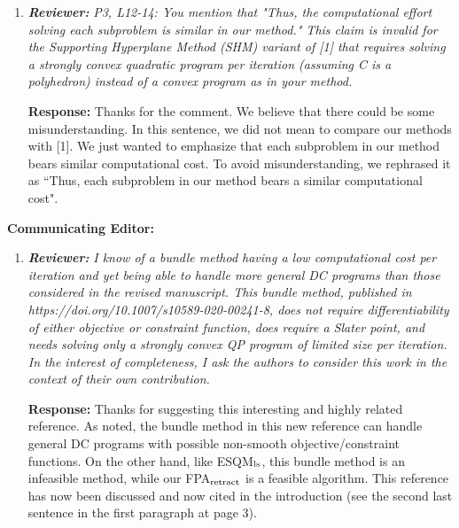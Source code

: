 \documentclass{article}
\begin{document}
\begin{enumerate}
    \item \textit{\textbf{Reviewer:}} \textit{P3, L12-14: You mention that "Thus, the computational effort solving each subproblem is similar in our method."
        This claim is invalid for the Supporting Hyperplane Method (SHM) variant of [1] that requires solving a strongly convex quadratic program per iteration (assuming C is a polyhedron) instead of a convex program as in your method.}
        
    \textbf{Response:} Thanks for the comment.  We believe that there could be some misunderstanding. In this sentence, we did not mean to compare our methods with [1]. We just wanted to emphasize that each subproblem in our method bears similar computational cost. To avoid misunderstanding, we rephrased it as ``Thus, each subproblem in our method bears a similar computational cost".
\end{enumerate} 
\textbf{Communicating Editor:}
\begin{enumerate}
        \item  \textit{\textbf{Reviewer:}} \textit{ I know of a bundle method having a low computational cost per iteration and yet being able to handle more general DC programs than those considered in the revised manuscript. This bundle method, published in https://doi.org/10.1007/s10589-020-00241-8, does not require differentiability of either objective or constraint function, does require a Slater point, and needs solving only a strongly convex QP program of limited size per iteration.  In the interest of completeness, I ask the authors to consider this work in the context of their own contribution.}
        
        \textbf{Response:} Thanks for suggesting this interesting and highly related reference. As noted, the bundle method in this new reference can handle general  DC programs with possible non-smooth objective/constraint functions. On the other hand, like ESQM$_{\rm ls}$, this bundle method is an infeasible method, while our FPA$_{\rm retract}$ is a feasible algorithm.  This reference has now been discussed and now cited in the introduction (see the second last sentence in the first paragraph at page 3).
        
\end{enumerate}
\end{document}
